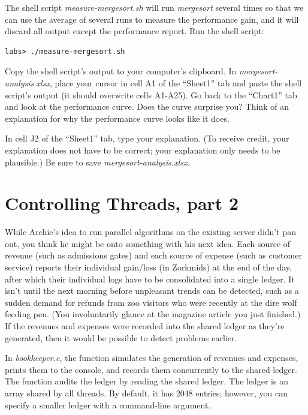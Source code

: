 The shell script \textit{measure-mergesort.sh} will run \textit{mergesort}
several times so that we can use the average of several runs to measure the
performance gain, and it will discard all output except the performance report.
Run the shell script:
\begin{verbatim}
labs> ./measure-mergesort.sh
\end{verbatim}

Copy the shell script's output to your computer's clipboard. In
\textit{mergesort-analysis.xlsx}, place your cursor in cell A1 of the
``Sheet1'' tab and paste the shell script's output (it should overwrite cells
A1-A25). Go back to the ``Chart1'' tab and look at the performance curve. Does
the curve surprise you? Think of an explanation for why the performance curve
looks like it does.

In cell J2 of the ``Sheet1'' tab, type your explanation. (To receive credit,
your explanation does not have to be correct; your explanation only needs to be
plausible.) Be sure to save \textit{mergesort-analysis.xlsx}.

\section{Controlling Threads, part 2}

While Archie's idea to run parallel algorithms on the existing server didn't
pan out, you think he might be onto something with his next idea. Each source
of revenue (such as admissions gates) and each source of expense (such as
customer service) reports their individual gain/loss (in Zorkmids) at the end
of the day, after which their individual logs have to be consolidated into a
single ledger. It isn't until the next morning before unpleasant trends can be
detected, such as a sudden demand for refunds from zoo visitors who were
recently at the dire wolf feeding pen. (You involuntarily glance at the
magazine article you just finished.) If the revenues and expenses were recorded
into the shared ledger as they're generated, then it would be possible to
detect problems earlier.

In \textit{bookkeeper.c}, the  function
simulates the generation of revenues and expenses, prints them to the console,
and records them concurrently to the shared ledger. The 
function audits the ledger by reading the shared ledger. The ledger is an array
shared by all threads. By default, it has 2048 entries; however, you can
specify a smaller ledger with a command-line argument.

